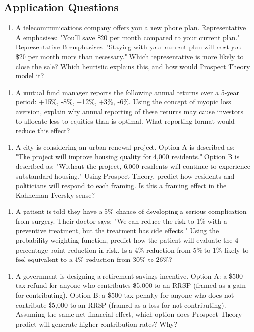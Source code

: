 \documentclass[12pt, letterpaper]{article}
\begin{document}
\subsection{Application Questions}


\begin{enumerate}
\item A telecommunications company offers you a new phone plan. Representative A emphasises: "You'll save \$20 per month compared to your current plan." Representative B emphasises: "Staying with your current plan will cost you \$20 per month more than necessary." Which representative is more likely to close the sale? Which heuristic explains this, and how would Prospect Theory model it?
\end{enumerate}

\begin{enumerate}
\item A mutual fund manager reports the following annual returns over a 5-year period: +15\%, -8\%, +12\%, +3\%, -6\%. Using the concept of myopic loss aversion, explain why annual reporting of these returns may cause investors to allocate less to equities than is optimal. What reporting format would reduce this effect?
\end{enumerate}

\begin{enumerate}
\item A city is considering an urban renewal project. Option A is described as: "The project will improve housing quality for 4,000 residents." Option B is described as: "Without the project, 6,000 residents will continue to experience substandard housing." Using Prospect Theory, predict how residents and politicians will respond to each framing. Is this a framing effect in the Kahneman-Tversky sense?
\end{enumerate}

\begin{enumerate}
\item A patient is told they have a 5\% chance of developing a serious complication from surgery. Their doctor says: "We can reduce the risk to 1\% with a preventive treatment, but the treatment has side effects." Using the probability weighting function, predict how the patient will evaluate the 4-percentage-point reduction in risk. Is a 4\% reduction from 5\% to 1\% likely to feel equivalent to a 4\% reduction from 30\% to 26\%?
\end{enumerate}

\begin{enumerate}
\item A government is designing a retirement savings incentive. Option A: a \$500 tax refund for anyone who contributes \$5,000 to an RRSP (framed as a gain for contributing). Option B: a \$500 tax penalty for anyone who does not contribute \$5,000 to an RRSP (framed as a loss for not contributing). Assuming the same net financial effect, which option does Prospect Theory predict will generate higher contribution rates? Why?
\end{enumerate}
\end{document}
